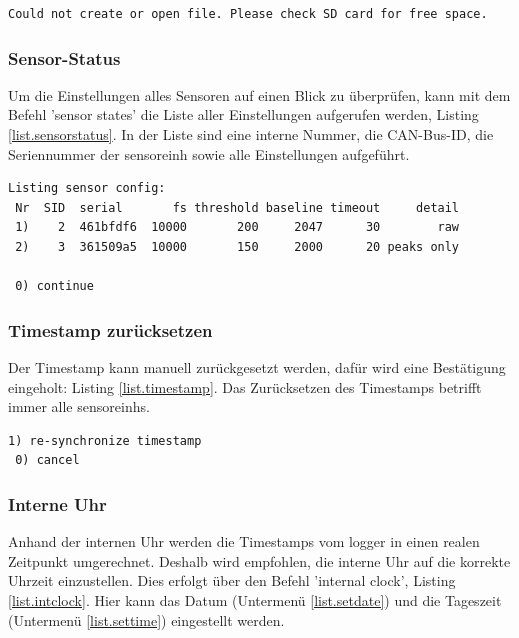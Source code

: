 \begin{lstlisting}[caption=Fehlermeldung beim Starten eines Sensors, label=list.sensorerror]
Could not create or open file. Please check SD card for free space.
\end{lstlisting}

\subsubsection{Sensor-Status}\label{sssec.sensorstate}
Um die Einstellungen alles Sensoren auf einen Blick zu überprüfen, kann mit dem Befehl 'sensor states' die Liste aller Einstellungen aufgerufen werden, Listing \ref{list.sensorstatus}. In der Liste sind eine interne Nummer, die CAN-Bus-ID, die Seriennummer der \gls{sensoreinh} sowie alle Einstellungen aufgeführt.

\begin{lstlisting}[caption=Untermenü Sensor-Status, label=list.sensorstatus]
Listing sensor config:
 Nr  SID  serial       fs threshold baseline timeout     detail
 1)    2  461bfdf6  10000       200     2047      30        raw
 2)    3  361509a5  10000       150     2000      20 peaks only
 
 0) continue
\end{lstlisting}


\subsubsection{Timestamp zurücksetzen}\label{sssec.timestamp}
Der Timestamp kann manuell zurückgesetzt werden, dafür wird eine Bestätigung eingeholt: Listing \ref{list.timestamp}. Das Zurücksetzen des Timestamps betrifft immer alle \glspl{sensoreinh}.

\begin{lstlisting}[caption=Untermenü Timestamp zurücksetzen, label=list.timestamp]
 1) re-synchronize timestamp
 0) cancel
\end{lstlisting}


\subsubsection{Interne Uhr}\label{sssec.intclock}
Anhand der internen Uhr werden die Timestamps vom \gls{logger} in einen realen Zeitpunkt umgerechnet. Deshalb wird empfohlen, die interne Uhr auf die korrekte Uhrzeit einzustellen. Dies erfolgt über den Befehl 'internal clock', Listing \ref{list.intclock}. Hier kann das Datum (Untermenü \ref{list.setdate}) und die Tageszeit (Untermenü \ref{list.settime}) eingestellt werden.

